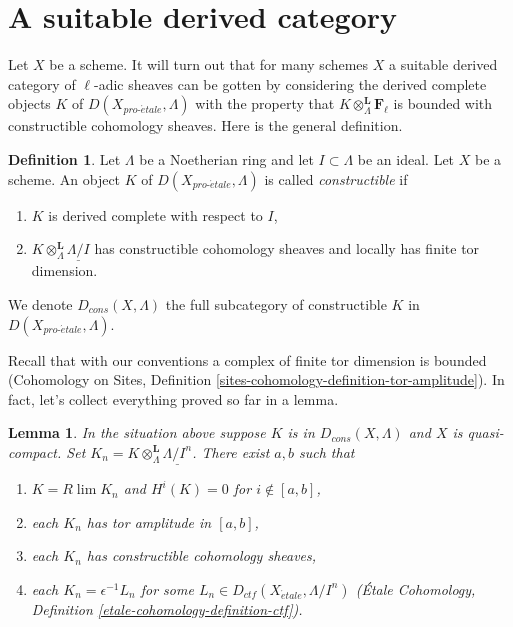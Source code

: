 \documentclass{stacks-project}
\theoremstyle{plain}
\newtheorem{lemma}[subsection]{Lemma}
\theoremstyle{definition}
\newtheorem{definition}[subsection]{Definition}
\theoremstyle{remark}
\numberwithin{equation}{subsection}
\def\lim{\mathop{\mathrm{lim}}\nolimits}
\def\proetale{{pro\text{-}\acute{e}tale}}
\def\etale{{\acute{e}tale}}
\begin{document}
\section{A suitable derived category}
\label{section-suitable-derived}

\noindent
Let $X$ be a scheme. It will turn out that for many schemes $X$ a suitable
derived category of $\ell$-adic sheaves can be gotten by considering the
derived complete objects $K$ of $D(X_\proetale, \Lambda)$ with the property
that $K \otimes_\Lambda^\mathbf{L} \mathbf{F}_\ell$ is bounded with
constructible cohomology sheaves. Here is the general definition.

\begin{definition}
\label{definition-Dbc}
Let $\Lambda$ be a Noetherian ring and let $I \subset \Lambda$ be an ideal.
Let $X$ be a scheme. An object $K$ of $D(X_\proetale, \Lambda)$ is called
{\it constructible} if
\begin{enumerate}
\item $K$ is derived complete with respect to $I$,
\item $K \otimes_\Lambda^\mathbf{L} \underline{\Lambda/I}$
has constructible cohomology sheaves and locally has finite tor dimension.
\end{enumerate}
We denote $D_{cons}(X, \Lambda)$ the full subcategory of constructible
$K$ in $D(X_\proetale, \Lambda)$.
\end{definition}

\noindent
Recall that with our conventions a complex of finite tor dimension
is bounded (Cohomology on Sites, Definition
\ref{sites-cohomology-definition-tor-amplitude}).
In fact, let's collect everything proved so far in a lemma.

\begin{lemma}
\label{lemma-describe-constructible-complexes}
In the situation above suppose $K$ is in $D_{cons}(X, \Lambda)$
and $X$ is quasi-compact. Set
$K_n = K \otimes_\Lambda^\mathbf{L} \underline{\Lambda/I^n}$.
There exist $a, b$ such that
\begin{enumerate}
\item $K = R\lim K_n$ and $H^i(K) = 0$ for $i \not \in [a, b]$,
\item each $K_n$ has tor amplitude in $[a, b]$,
\item each $K_n$ has constructible cohomology sheaves,
\item each $K_n = \epsilon^{-1}L_n$ for some
$L_n \in D_{ctf}(X_\etale, \Lambda/I^n)$
(\'Etale Cohomology, Definition \ref{etale-cohomology-definition-ctf}).
\end{enumerate}
\end{lemma}
\end{document}
